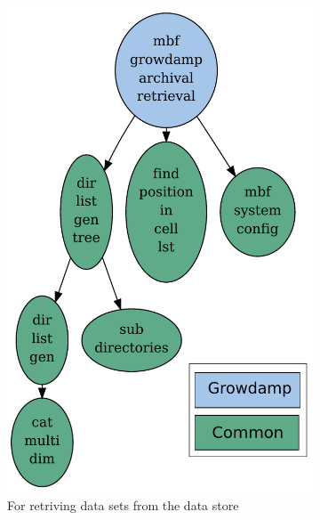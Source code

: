 \documentclass{report}
\begin{document}
\begin{figure}[hbt]
   \centering
    \begin{subfigure}[b]{0.3\textwidth}
        \includegraphics[width=\textwidth]{mbf_growdamp_archival_retrieval.pdf}
        \caption{For retriving data sets from the data store}
        \label{fig:growdamp_archiving_retrival}
    \end{subfigure}
    ~ %
    \begin{subfigure}[b]{0.3\textwidth}

\end{subfigure}
\end{figure}
\end{document}
